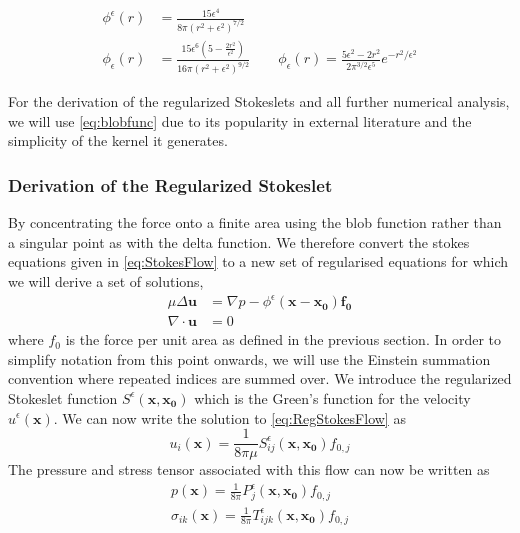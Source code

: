 \begin{align}
    \phi^\epsilon(r) &= \frac{15 \epsilon^4}{8\pi\left( r^2 +\epsilon^2 \right)^{7/2}} \label{eq:blobfunc}\\
    \phi_{\epsilon}(r) &= \frac{15 \epsilon^{6}\left(5-\frac{2 r^{2}}{\epsilon^{2}}\right)}{16 \pi\left(r^{2}+\epsilon^{2}\right)^{9 / 2}} \quad\quad \phi_{\epsilon}(r)=\frac{5 \epsilon^{2}-2 r^{2}}{2 \pi^{3 / 2} \epsilon^{5}} e^{-r^{2} / \epsilon^{2}} \label{eq:blobfunc2} 
\end{align}

For the derivation of the regularized Stokeslets and all further numerical analysis, we will use \cref{eq:blobfunc} due to its popularity in external literature and the simplicity of the kernel it generates.

\subsubsection{Derivation of the Regularized Stokeslet}
By concentrating the force onto a finite area using the blob function rather than a singular point as with the delta function. We therefore convert the stokes equations given in \cref{eq:StokesFlow} to a new set of regularised equations for which we will derive a set of solutions,
\begin{subequations}
\label{eq:RegStokesFlow}
\begin{align}
    \mu\Delta\boldsymbol{u} &= \nabla p - \phi^{\epsilon}(\mathbf{x}-\mathbf{x_0})\mathbf{f_0} \label{eq:RegStokesFlow1} \\
    \nabla \cdot \boldsymbol{u} &= 0 \label{eq:RegStokesFlow2}
\end{align}
\end{subequations}
where $f_0$ is the force per unit area as defined in the previous section.
In order to simplify notation from this point onwards, we will use the Einstein summation convention where repeated indices are summed over. We introduce the regularized Stokeslet function $S^\epsilon(\mathbf{x},\mathbf{x_0})$ which is the Green's function for the velocity $u^\epsilon(\mathbf{x})$. We can now write the solution to \cref{eq:RegStokesFlow} as
\begin{equation}
\label{eq:regvelsol}
    u_i(\mathbf{x}) = \frac{1}{8\pi\mu}S^\epsilon_{ij}(\mathbf{x},\mathbf{x_0})f_{0,j}
\end{equation}
The pressure and stress tensor associated with this flow can now be written as
\begin{gather}
\label{eq:regpressuresol}
    p(\mathbf{x}) = \frac{1}{8\pi}P^\epsilon_{j}(\mathbf{x},\mathbf{x_0})f_{0,j}\\
\label{eq:regstresssol}
    \sigma_{ik}(\mathbf{x}) = \frac{1}{8\pi}T^\epsilon_{ijk}(\mathbf{x},\mathbf{x_0})f_{0,j}\\
\end{gather}
